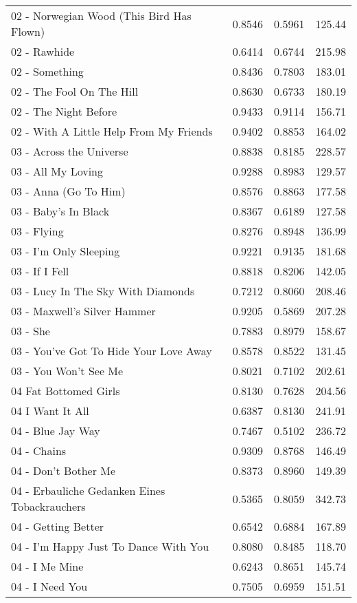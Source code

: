 \begin{longtable}[c]{|l|c|l|l|}
02 - Norwegian Wood (This Bird Has Flown) & 0.8546 & 0.5961 & 125.44 \\
02 - Rawhide & 0.6414 & 0.6744 & 215.98 \\
02 - Something & 0.8436 & 0.7803 & 183.01 \\
02 - The Fool On The Hill & 0.8630 & 0.6733 & 180.19 \\
02 - The Night Before & 0.9433 & 0.9114 & 156.71 \\
02 - With A Little Help From My Friends & 0.9402 & 0.8853 & 164.02 \\
03 - Across the Universe & 0.8838 & 0.8185 & 228.57 \\
03 - All My Loving & 0.9288 & 0.8983 & 129.57 \\
03 - Anna (Go To Him) & 0.8576 & 0.8863 & 177.58 \\
03 - Baby's In Black & 0.8367 & 0.6189 & 127.58 \\
03 - Flying & 0.8276 & 0.8948 & 136.99 \\
03 - I'm Only Sleeping & 0.9221 & 0.9135 & 181.68 \\
03 - If I Fell & 0.8818 & 0.8206 & 142.05 \\
03 - Lucy In The Sky With Diamonds & 0.7212 & 0.8060 & 208.46 \\
03 - Maxwell's Silver Hammer & 0.9205 & 0.5869 & 207.28 \\
03 - She & 0.7883 & 0.8979 & 158.67 \\
03 - You've Got To Hide Your Love Away & 0.8578 & 0.8522 & 131.45 \\
03 - You Won't See Me & 0.8021 & 0.7102 & 202.61 \\
04 Fat Bottomed Girls & 0.8130 & 0.7628 & 204.56 \\
04 I Want It All & 0.6387 & 0.8130 & 241.91 \\
04 - Blue Jay Way & 0.7467 & 0.5102 & 236.72 \\
04 - Chains & 0.9309 & 0.8768 & 146.49 \\
04 - Don't Bother Me & 0.8373 & 0.8960 & 149.39 \\
04 - Erbauliche Gedanken Eines Tobackrauchers & 0.5365 & 0.8059 & 342.73 \\
04 - Getting Better & 0.6542 & 0.6884 & 167.89 \\
04 - I'm Happy Just To Dance With You & 0.8080 & 0.8485 & 118.70 \\
04 - I Me Mine & 0.6243 & 0.8651 & 145.74 \\
04 - I Need You & 0.7505 & 0.6959 & 151.51 \\

\end{longtable}
